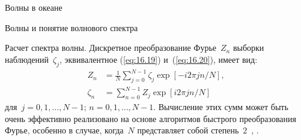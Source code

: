 \begin{chapter}{Волны в океане}
\begin{section}{Волны и понятие волнового спектра}
\begin{paragraph}{Расчет спектра волны.}
Дискретное преобразование Фурье~$Z_n$
выборки наблюдений~$\zeta_j$, эквивалентное (\ref{eq:16.19}) 
и~(\ref{eq:16.20}), имеет вид:
\begin{subequations}
\begin{align}
    Z_{n} &= \frac{1}{N} \sum_{j=0}^{N-1} \zeta_{j} \exp [-i2 \pi j n /N], \\
\zeta_{n} &= \sum_{n=0}^{N-1} Z_{j} \exp [i 2 \pi j n /N]
\end{align}
\end{subequations}
для~$j=0,1,\ldots, N-1$; $n= 0, 1, \ldots, N-1$. Вычисление этих сумм
может быть очень эффективно реализовано на основе алгоритмов быстрого
преобразования Фурье, особенно в случае, когда~$N$ представляет собой 
степень~$2$~\cite{Cooley:1970}, \cite[стр.~542]{Press:1992}.
%


\end{paragraph}
\end{section}
\end{chapter}
